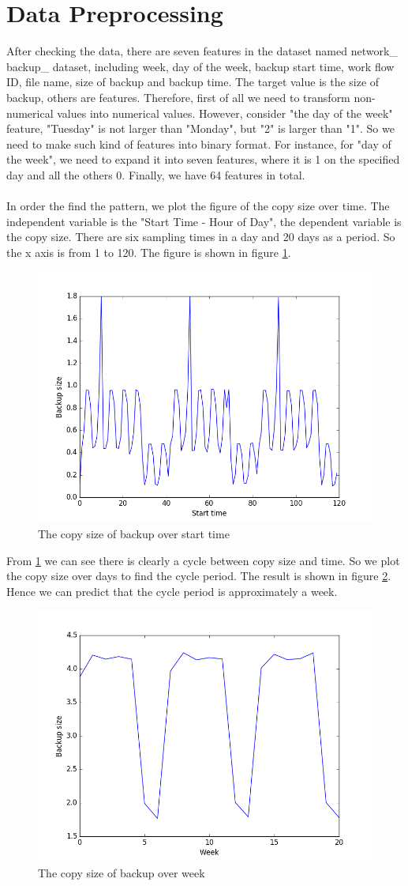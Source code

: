 \documentclass{article}
\begin{document}
\section{Data Preprocessing}
After checking the data, there are seven features in the dataset named network\_ backup\_ dataset, including week, day of the week, backup start time, work flow ID, file name, size of backup and backup time. The target value is the size of backup, others are features. Therefore, first of all we need to transform non-numerical values into numerical values. However, consider "the day of the week" feature, "Tuesday" is not larger than "Monday", but "2" is larger than "1". So we need to make such kind of features into binary format. For instance, for "day of the week", we need to expand it into seven features, where it is 1 on the specified day and all the others 0. Finally, we have 64 features in total.\\
\\
In order the find the pattern, we plot the figure of the copy size over time. The independent variable is the "Start Time - Hour of Day", the dependent variable is the copy size. There are six sampling times in a day and 20 days as a period. So the x axis is from 1 to 120. The figure is shown in figure \ref{fig:start_time}.
\begin{figure}[htbp]
\centering
\includegraphics[width=.6\textwidth]{pattern_start.png}
\caption{The copy size of backup over start time}
\label{fig:start_time}
\end{figure}
From \ref{fig:start_time} we can see there is clearly a cycle between copy size and time. So we plot the copy size over days to find the cycle period. The result is shown in figure \ref{fig:day}. Hence we can predict that the cycle period is approximately a week.
\begin{figure}[htbp]
\centering
\includegraphics[width=.6\textwidth]{pattern_week.png}
\caption{The copy size of backup over week}
\label{fig:day}
\end{figure}
\end{document}
